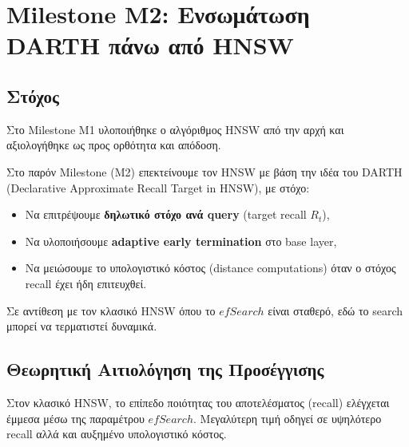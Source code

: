 \documentclass[12pt,a4paper]{article}
\begin{document}



\section{Milestone M2: Ενσωμάτωση DARTH πάνω από HNSW}

\subsection{Στόχος}

Στο Milestone M1 υλοποιήθηκε ο αλγόριθμος HNSW από την αρχή και αξιολογήθηκε ως προς ορθότητα και απόδοση. 

Στο παρόν Milestone (M2) επεκτείνουμε τον HNSW με βάση την ιδέα του DARTH (Declarative Approximate Recall Target in HNSW), με στόχο:

\begin{itemize}
    \item Να επιτρέψουμε \textbf{δηλωτικό στόχο ανά query} (target recall $R_t$),
    \item Να υλοποιήσουμε \textbf{adaptive early termination} στο base layer,
    \item Να μειώσουμε το υπολογιστικό κόστος (distance computations) όταν ο στόχος recall έχει ήδη επιτευχθεί.
\end{itemize}

Σε αντίθεση με τον κλασικό HNSW όπου το $efSearch$ είναι σταθερό, εδώ το search μπορεί να τερματιστεί δυναμικά.


\subsection{Θεωρητική Αιτιολόγηση της Προσέγγισης}
Στον κλασικό HNSW, το επίπεδο ποιότητας του αποτελέσματος (recall) ελέγχεται έμμεσα μέσω της παραμέτρου $efSearch$. Μεγαλύτερη τιμή οδηγεί σε υψηλότερο recall αλλά και αυξημένο υπολογιστικό κόστος.
\end{document}
